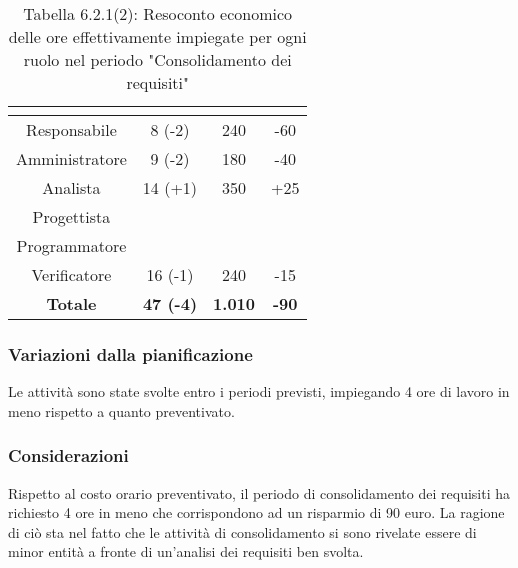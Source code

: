 \renewcommand{\arraystretch}{1.4}
\begin{table}[H]
\begin{center}
\begin{tabular}{|c|c|c|c|}
\hline
\rowcolor{title_row}
\textbf{\color{title_text}{Ruolo}}  & \textbf{\color{title_text}{Ore}} & \textbf{\color{title_text}{Costo in \euro}} & \textbf{\color{title_text}{Differenza al preventivo in \euro}} \\ \hline
Responsabile    & 8 (-2) & 240 & -60 \\ \hline
Amministratore  & 9 (-2) & 180 & -40 \\ \hline
Analista        & 14 (+1) & 350 & +25 \\ \hline
Progettista     & & &  \\ \hline
Programmatore   & & &  \\ \hline
Verificatore    & 16 (-1) & 240 & -15  \\ \hline
\textbf{Totale} & \textbf{47 (-4)}    & \textbf{1.010} & \textbf{-90} \\ \hline
\end{tabular}
\caption{Tabella 6.2.1(2): Resoconto economico delle ore effettivamente impiegate per ogni ruolo nel periodo "Consolidamento dei requisiti"\label{}}
\end{center}
\end{table}
\renewcommand{\arraystretch}{1}


\subsubsection{Variazioni dalla pianificazione}
Le attività sono state svolte entro i periodi previsti, impiegando 4 ore di lavoro in meno rispetto a quanto preventivato.

\subsubsection{Considerazioni}
Rispetto al costo orario preventivato, il periodo di consolidamento dei requisiti ha richiesto 4
ore in meno che corrispondono ad un risparmio di 90 euro. La ragione di ciò sta nel fatto che le attività di consolidamento si sono rivelate essere
di minor entità a fronte di un'analisi dei requisiti ben svolta.
\pagebreak
